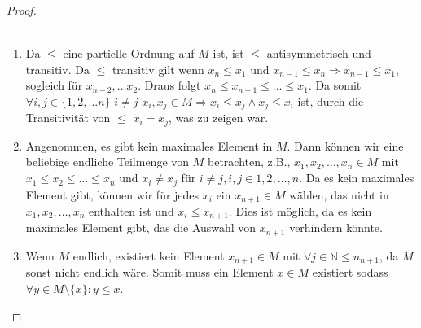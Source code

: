 \documentclass{exam}
\begin{document}
\begin{proof} \\\
	\begin{enumerate}[label=\roman*)]
		\item
		      Da $\le$ eine partielle Ordnung auf $M$ ist, ist $\le$ antisymmetrisch und transitiv.
		      Da $\le$ transitiv gilt wenn $x_n \le x_1$ und $x_{n-1} \le x_n \Rightarrow x_{n-1} \le x_1$, sogleich für $x_{n-2}, \dots x_2$.
		      Draus folgt $x_n \leq x_{n-1} \le \dots \le x_1$.
		      Da somit $\forall i,j \in \{1,2,\dots n\}$ $i \ne j$ $x_i,x_j \in M \Rightarrow x_i \le x_j \land x_j \le x_i$ ist,
		      durch die Transitivität von $\le$ $x_i = x_j$, was zu zeigen war.
		      \checkmark
		\item
		      Angenommen, es gibt kein maximales Element in $M$. Dann können wir eine beliebige endliche Teilmenge von $M$ betrachten, z.B., $x_1, x_2, \ldots, x_n \in M$ mit $x_1 \leq x_2 \leq \ldots \leq x_n$ und $x_i \neq x_j$ für $i \neq j, i, j \in {1, 2, \ldots, n}$.
		      Da es kein maximales Element gibt, können wir für jedes $x_i$ ein $x_{n+1} \in M$ wählen, das nicht in ${x_1, x_2, \ldots, x_n}$ enthalten ist und $x_i \leq x_{n+1}$. Dies ist möglich, da es kein maximales Element gibt, das die Auswahl von $x_{n+1}$ verhindern könnte.
		      \checkmark
		\item
		      Wenn $M$ endlich, existiert kein Element $x_{n+1} \in M$ mit $\forall j \in \mathbb{N} \le n_{n+1}$, da $M$ sonst nicht endlich wäre.
		      Somit muss ein Element $x \in M$ existiert sodass $\forall y \in M \setminus \{x\}: y \le x$.
		      \checkmark
	\end{enumerate}
\end{proof}

\pagebreak
\end{document}
